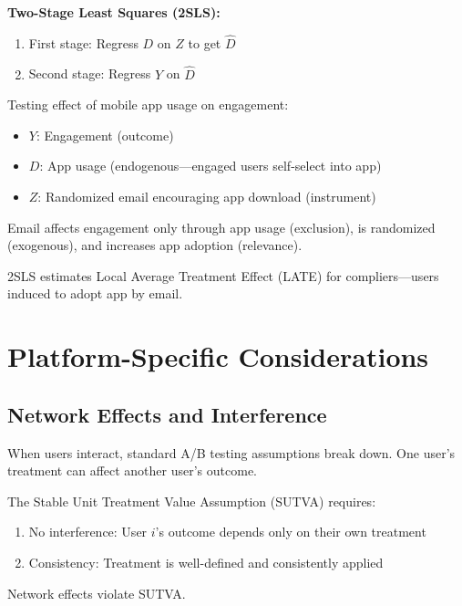 \textbf{Two-Stage Least Squares (2SLS):}
\begin{enumerate}
    \item First stage: Regress $D$ on $Z$ to get $\hat{D}$
    \item Second stage: Regress $Y$ on $\hat{D}$
\end{enumerate}

\begin{example}
Testing effect of mobile app usage on engagement:
\begin{itemize}
    \item $Y$: Engagement (outcome)
    \item $D$: App usage (endogenous—engaged users self-select into app)
    \item $Z$: Randomized email encouraging app download (instrument)
\end{itemize}

Email affects engagement only through app usage (exclusion), is randomized (exogenous), and increases app adoption (relevance).

2SLS estimates Local Average Treatment Effect (LATE) for compliers—users induced to adopt app by email.
\end{example}

\section{Platform-Specific Considerations}

\subsection{Network Effects and Interference}

When users interact, standard A/B testing assumptions break down. One user's treatment can affect another user's outcome.

\begin{definition}
The Stable Unit Treatment Value Assumption (SUTVA) requires:
\begin{enumerate}
    \item No interference: User $i$'s outcome depends only on their own treatment
    \item Consistency: Treatment is well-defined and consistently applied
\end{enumerate}

Network effects violate SUTVA.
\end{definition}

